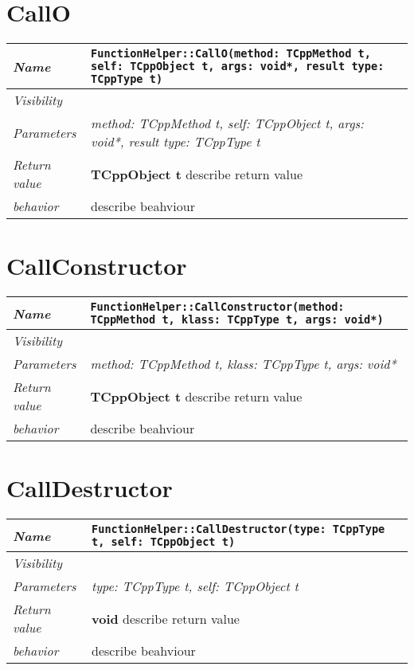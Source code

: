  \section{CallO}
\begin{longtable}{p{3cm} @{\hskip 1cm} p{12cm}}
 \hline
\textit{Name} & \texttt{FunctionHelper::CallO(method: TCppMethod t, self: TCppObject t, args: void*, result type: TCppType t)}\\
\hline
 \textit{Visibility} & \\
\hline
\textit{Parameters} & \textit{method: TCppMethod t, self: TCppObject t, args: void*, result type: TCppType t}\\
\hline
\textit{Return value} & \textbf{ TCppObject t} describe return value\\
  \hline
 \textit{behavior} & describe beahviour \\
\hline
\end{longtable} \pagebreak
 \section{CallConstructor}
\begin{longtable}{p{3cm} @{\hskip 1cm} p{12cm}}
 \hline
\textit{Name} & \texttt{FunctionHelper::CallConstructor(method: TCppMethod t, klass: TCppType t, args: void*)}\\
\hline
 \textit{Visibility} & \\
\hline
\textit{Parameters} & \textit{method: TCppMethod t, klass: TCppType t, args: void*}\\
\hline
\textit{Return value} & \textbf{ TCppObject t} describe return value\\
  \hline
 \textit{behavior} & describe beahviour \\
\hline
\end{longtable} \pagebreak
 \section{CallDestructor}
\begin{longtable}{p{3cm} @{\hskip 1cm} p{12cm}}
 \hline
\textit{Name} & \texttt{FunctionHelper::CallDestructor(type: TCppType t, self: TCppObject t)}\\
\hline
 \textit{Visibility} & \\
\hline
\textit{Parameters} & \textit{type: TCppType t, self: TCppObject t}\\
\hline
\textit{Return value} & \textbf{ void} describe return value\\
  \hline
 \textit{behavior} & describe beahviour \\
\hline
\end{longtable} \pagebreak
